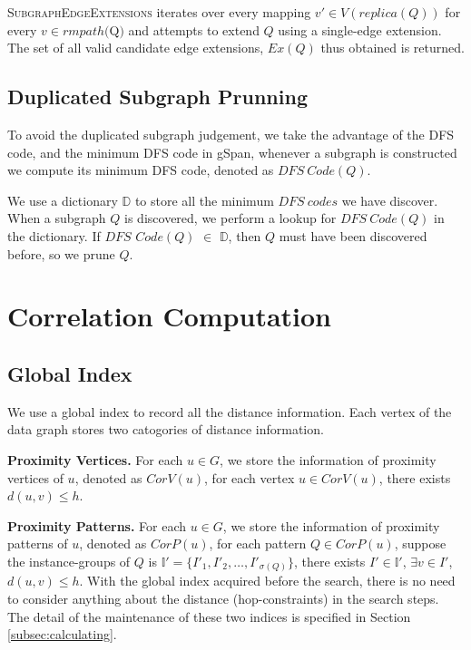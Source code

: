 \textsc{SubgraphEdgeExtensions} iterates over every mapping $v'\in
V(replica(Q))$ for every $v\in rmpath($Q$)$ and attempts to extend $Q$ using a
single-edge extension. The set of all valid candidate edge extensions, $Ex(Q)$ thus
obtained is returned. 

\subsection{Duplicated Subgraph Prunning}
To avoid the duplicated subgraph judgement, we take the advantage of the DFS
code, and the minimum DFS code in gSpan\cite{YH02}, whenever a subgraph is
constructed we compute its minimum DFS code, denoted as $DFS\ Code(Q)$.

\par We use a dictionary $\mathbb{D}$ to store all the minimum $DFS\ codes$ we have
discover. When a subgraph $Q$ is discovered, we perform a lookup for $DFS\ Code(Q)$ in the
dictionary. If $DFS$ $Code(Q)$ $\in$ $\mathbb{D}$, then $Q$ must have been discovered before,
so we prune $Q$.


\section{Correlation Computation}
\label{subsec:corrcomp}

\subsection{Global Index}
\label{subsec:global-index}

We use a global index to record all the distance information. Each vertex of the data graph stores two catogories of distance information.

\squishlist
\item{\bf Proximity Vertices.} For each $u\in G$, we store the information of proximity vertices of $u$, denoted as $CorV(u)$, for each vertex $u\in CorV(u)$, there exists $d(u,v)\le h$.
\squishend
\squishlist
\item{\bf Proximity Patterns.} For each $u\in G$, we store the information of proximity patterns of $u$, denoted as $CorP(u)$, for each pattern $Q\in CorP(u)$, suppose the instance-groups of $Q$ is $\mathbb{I'}=\{I'_1,I'_2,\ldots,I'_{\sigma(Q)}\}$, there exists $I'\in \mathbb{I'}$, $\exists v\in I'$, $d(u,v)\le h$.
\squishend
With the global index acquired before the search, there is no need to consider anything about the distance (hop-constraints) in the search steps. The detail of the maintenance of these two indices is specified in Section \ref{subsec:calculating}.

